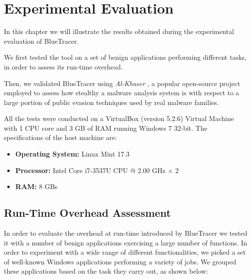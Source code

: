 
\chapter{Experimental Evaluation}

In this chapter we will illustrate the results obtained during the experimental evaluation of BlueTracer.

We first tested the tool on a set of benign applications performing different tasks, in order to assess its run-time overhead.

Then, we validated BlueTracer using \textit{Al-Khaser} \cite{AlK}, a popular open-source project employed to assess how stealthy a malware analysis system is with respect to a large portion of public evasion techniques used by real malware families.

\iffalse
Finally, we employed BlueTracer to analyze a group of highly evasive real malware samples collected by Joe Security, the proclaimed technology leader for the analysis of evasive malware.
\fi

\iffalse
If JoeBox added differentiate machines
\fi
All the tests were conducted on a VirtualBox (version 5.2.6)  Virtual Machine with 1 CPU core and 3 GB of RAM running Windows 7 32-bit. The specifications of the host machine are:
\begin{itemize}
\item \textbf{Operating System:} Linux Mint 17.3 
\item \textbf{Processor:} Intel Core i7-3537U CPU @ 2.00 GHz $\times$ 2
\item \textbf{RAM:} 8 GBs  
\end{itemize}
 

\section{Run-Time Overhead Assessment}

In order to evaluate the overhead at run-time introduced by BlueTracer we tested it with a number of benign applications exercising a large number of functions. In order to experiment with a wide range of different functionalities, we picked a set of well-known Windows applications performing a variety of jobs. We grouped these applications based on the task they carry out, as shown below:

